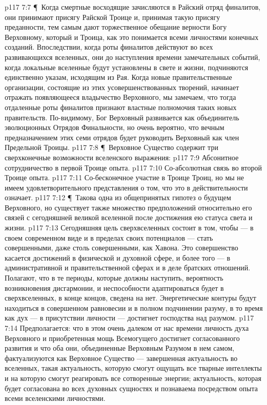 \vs p117 7:7 \P\ Когда смертные восходящие зачисляются в Райский отряд финалитов, они принимают присягу Райской Троице и, принимая такую присягу преданности, тем самым дают торжественное обещание верности Богу Верховному, который и  Троица, как это понимается всеми личностями конечных созданий. Впоследствии, когда роты финалитов действуют во всех развивающихся вселенных, они до наступления времени замечательных событий, когда локальные вселенные будут установлены в свете и жизни, подчиняются единственно указам, исходящим из Рая. Когда новые правительственные организации, состоящие из этих усовершенствованных творений, начинает отражать появляющееся владычество Верховного, мы замечаем, что тогда отдаленные роты финалитов признают властные полномочия таких новых правительств. По\hyp{}видимому, Бог Верховный развивается как объединитель эволюционных Отрядов Финальности, но очень вероятно, что вечным предназначением этих семи отрядов будет руководить Верховный как член Предельной Троицы.
\vs p117 7:8 \P\ Верховное Существо содержит три сверхконечные возможности вселенского выражения:
\vs p117 7:9 \bibnobreakspace Абсонитное сотрудничество в первой Троице опыта.
\vs p117 7:10 \bibnobreakspace Со\hyp{}абсолютная связь во второй Троице опыта.
\vs p117 7:11 \bibnobreakspace Со\hyp{}бесконечное участие в Троице Троиц, но мы не имеем удовлетворительного представления о том, что это в действительности означает.
\vs p117 7:12 \P\ Такова одна из общепринятых гипотез о будущем Верховного, но существует также множество предположений относительно его связей с сегодняшней великой вселенной после достижения ею статуса света и жизни.
\vs p117 7:13 Сегодняшняя цель сверхвселенных состоит в том, чтобы --- в своем современном виде и в пределах своих потенциалов --- стать совершенными, даже столь совершенными, как Хавона. Это совершенство касается достижений в физической и духовной сфере, и более того --- в административной и правительственной сферах и в деле братских отношений. Полагают, что в те периоды, которые должны наступить, вероятность возникновения дисгармонии, и неспособности адаптироваться будет в сверхвселенных, в конце концов, сведена на нет. Энергетические контуры будут находиться в совершенном равновесии и в полном подчинении разуму, в то время как дух --- в присутствии личности --- достигнет господства над разумом.
\vs p117 7:14 Предполагается: что в этом очень далеком от нас времени личность духа Верховного и приобретенная мощь Всемогущего достигнет согласованного развития и что оба они, объединенные Верховным Разумом в нем самом, фактуализуются как Верховное Существо --- завершенная актуальность во вселенных, такая актуальность, которую смогут ощущать все тварные интеллекты и на которую смогут реагировать все сотворенные энергии; актуальность, которая будет согласована во всех духовных сущностях и познаваема посредством опыта всеми вселенскими личностями.

